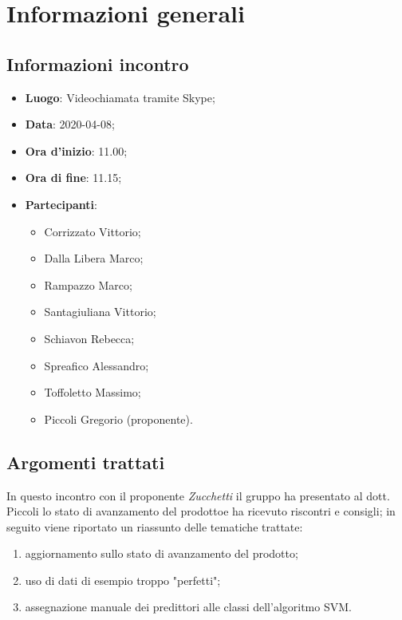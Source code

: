 \section{Informazioni generali}
    \subsection{Informazioni incontro}
        \begin{itemize}
            \item \textbf{Luogo}: Videochiamata tramite Skype;
            \item \textbf{Data}: 2020-04-08;
            \item \textbf{Ora d'inizio}: 11.00;
            \item \textbf{Ora di fine}: 11.15;
            \item \textbf{Partecipanti}: 
            \begin{itemize}
            	\item Corrizzato Vittorio;
                \item Dalla Libera Marco;
                \item Rampazzo Marco;
                \item Santagiuliana Vittorio;
                \item Schiavon Rebecca;
                \item Spreafico Alessandro;
                \item Toffoletto Massimo;
                \item Piccoli Gregorio (proponente).
            \end{itemize}
        \end{itemize}
    \subsection{Argomenti trattati}
        In questo incontro con il proponente \textit{Zucchetti} il gruppo ha presentato al dott. Piccoli lo stato di avanzamento del prodotto\glosp e ha ricevuto riscontri e consigli; in seguito viene riportato un riassunto delle tematiche trattate:
        \begin{enumerate}
            \item aggiornamento sullo stato di avanzamento del prodotto\glo;
            \item uso di dati di esempio troppo "perfetti";
            \item assegnazione manuale dei predittori alle classi dell'algoritmo SVM\glo.
        \end{enumerate}
